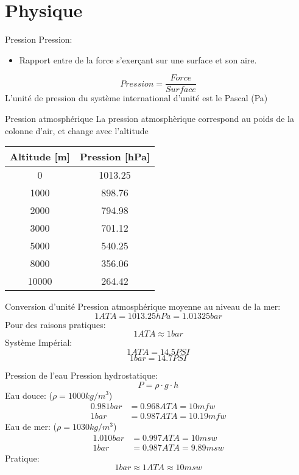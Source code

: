 
\section{Physique}

\begin{frame}{Pression}  
	Pression:
	\begin{itemize}
		\item Rapport entre de la force s'exerçant sur une surface et son aire.
	\end{itemize}
	\[ \boxed{ Pression = \dfrac{Force}{Surface} } \]
	\vfill
	L'unité de pression du système international d'unité est le Pascal (Pa)\\
\end{frame}

\begin{frame}{Pression atmosphérique}  
	La pression atmosphèrique correspond au poids de la colonne d'air, et change avec l'altitude\\
	\centering
	\begin{tabular}{| c | c |}
		\hline
		Altitude [m] & Pression [hPa] \\
		\hline
		0		& 1013.25 \\
		1000 	& 898.76 \\
		2000 	& 794.98 \\
		3000 	& 701.12 \\
		5000 	& 540.25 \\
		8000 	& 356.06 \\
		10000 & 264.42 \\
		\hline
	\end{tabular}
\end{frame}

\begin{frame}{Conversion d'unité}  
	Pression atmosphérique moyenne au niveau de la mer:
	\[ 1 ATA = 1013.25 hPa = 1.01325 bar \]
	Pour des raisons pratiques:
	\[ 1 ATA \approx 1 bar\]
	Système Impérial:
	\[ 1 ATA = 14.5 PSI\]
	\[ 1 bar = 14.7 PSI\]
\end{frame}

\begin{frame}{Pression de l'eau}
	Pression hydrostatique:
	\[ P = \rho \cdot g \cdot h\]
	Eau douce: ($\rho = 1000kg / m^3$)
	\begin{align*}
		0.981 bar &= 0.968 ATA = 10 mfw\\
		1 bar &= 0.987 ATA = 10.19 mfw
	\end{align*}
	Eau de mer: ($\rho = 1030kg / m^3$)
	\begin{align*}
		1.010 bar &= 0.997 ATA = 10 msw\\
		1 bar &= 0.987 ATA = 9.89 msw
	\end{align*}
	Pratique:
	\[ 1bar \approx 1 ATA \approx 10msw\]
\end{frame}

